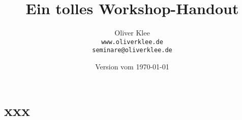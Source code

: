\documentclass[a4paper,openany,twoside,titlepage,10pt,headsepline]{scrbook}
\title{Ein tolles Workshop-Handout}
\author{Oliver Klee\\\texttt{www.oliverklee.de}\\\texttt{seminare@oliverklee.de}}
\date{Version vom \today}
\begin{document}
\frontmatter

\maketitle

\tableofcontents

\mainmatter

\chapter{xxx}






\backmatter
\end{document}
